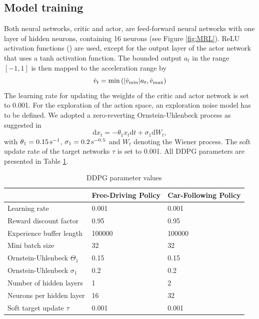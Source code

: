 \documentclass[review]{elsarticle}
\providecommand{\sub}[1]{_{\mathrm{#1}}}  %
\providecommand{\3}{{\ss}}
\begin{document}
	\subsection{Model training}
	Both neural networks, critic and actor, are feed-forward neural
	networks with one layer of hidden neurons, containing 16 neurons (see
	Figure \ref{fig:MRL}). ReLU activation functions (\cite{relu}) are used, except for the output layer of the actor network that uses a tanh activation function. The bounded output $a_t$ in the range $[-1,1]$ is then mapped to the acceleration range by
	\begin{equation}
		\dot{v}_t = \min \left( \abs{\dot{v}\sub{min}} a_t, \dot{v}\sub{max}\right)
	\end{equation}
	The learning rate for updating the weights of the critic and actor network is set to 0.001. For the exploration of the action space, an exploration noise model has to be defined. We adopted a
	zero-reverting Ornstein-Uhlenbeck process as suggested in \cite{DDPG}
	\begin{equation}
    \mathrm{d} x_{t}=-\theta_1 x_{t} \mathrm{d} t+\sigma_1 \mathrm{d} W_{t},
	\end{equation}
    with $\theta_1 = \unit[0.15]{s^{-1}}$, $\sigma_1 = \unit[0.2]{s^{-0.5}}$ and $W_{t}$ denoting the Wiener process.	
 	The soft update rate of the target networks $\tau$ is set to
	0.001. All DDPG parameters are presented in Table \ref{tab:DDPGparameters}.
	\begin{table}
		\caption{DDPG parameter values} 
		\label{tab:DDPGparameters} 
		\begin{center}
			\begin{tabular}{ p{} p{0.2\textwidth}  p{} }
				& Free-Driving Policy & Car-Following Policy \\ \hline
				Learning rate & 0.001 & 0.001\\ 
				Reward discount factor & 0.95 & 0.95 \\ 
				Experience buffer length & 100000 & 100000 \\ 
				Mini batch size & 32 & 32 \\ 			
				Ornstein-Uhlenbeck  $\Theta_1$ & 0.15& 0.15 \\ 
				Ornstein-Uhlenbeck  $\sigma_1$ & 0.2 & 0.2 \\				
				Number of hidden layers & 1 & 2\\
				Neurons per hidden layer & 16 & 32\\
				Soft target update  $\tau$ & 0.001 & 0.001\\
				
				
			\end{tabular}
		\end{center}
	\end{table}
\end{document}
